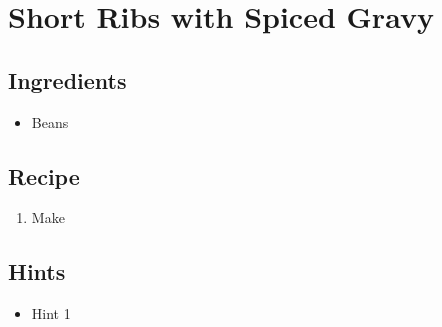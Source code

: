 \section{Short Ribs with Spiced Gravy}
\subsection*{Ingredients}
\begin{itemize}
    \item Beans
\end{itemize}

\subsection*{Recipe}
\begin{enumerate}
    \item Make
\end{enumerate}

\subsection*{Hints}
\begin{itemize}
    \item Hint 1
\end{itemize}
\newpage